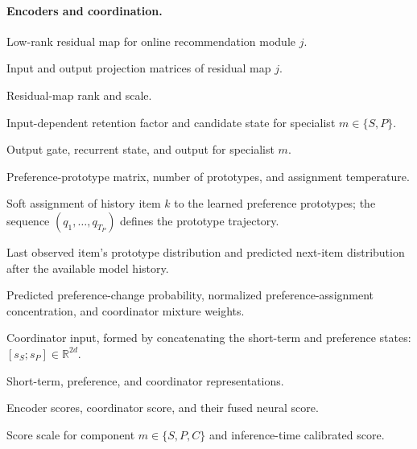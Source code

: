 ﻿\documentclass[sigconf,anonymous,review]{acmart}
\begin{document}
\paragraph{Encoders and coordination.}
\begin{description}[leftmargin=2.4cm,labelwidth=2.1cm,itemsep=0pt]
\item[$\mathcal R_j$] Low-rank residual map for online recommendation module $j$.
\item[$A_j,B_j$] Input and output projection matrices of residual map $j$.
\item[$r,\alpha_{\mathrm{LoRA}}$] Residual-map rank and scale.
\item[$a_k^{(m)},\widetilde h_k^{(m)}$] Input-dependent retention factor and candidate state for specialist $m\in\{S,P\}$.
\item[$g_k^{(m)},h_k^{(m)},o_k^{(m)}$] Output gate, recurrent state, and output for specialist $m$.
\item[$\mathbf V,M,\tau_p$] Preference-prototype matrix, number of prototypes, and assignment temperature.
\item[$q_k$] Soft assignment of history item $k$ to the learned preference prototypes; the sequence $(q_1,\ldots,q_{T_P})$ defines the prototype trajectory.
\item[$q_{T_P},\widehat q_{t+1}$] Last observed item's prototype distribution and predicted next-item distribution after the available model history.
\item[$\rho_t,c_t,w_S,w_P$] Predicted preference-change probability, normalized preference-assignment concentration, and coordinator mixture weights.
\item[$x_C$] Coordinator input, formed by concatenating the short-term and preference states: $[s_S;s_P]\in\mathbb R^{2d}$.
\item[$s_S,s_P,s_C$] Short-term, preference, and coordinator representations.
\item[$z_S,z_P,z_C,z$] Encoder scores, coordinator score, and their fused neural score.
\item[$\kappa_m,\widetilde z$] Score scale for component $m\in\{S,P,C\}$ and inference-time calibrated score.
\end{description}
\end{document}
